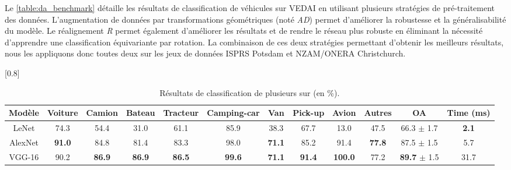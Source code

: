 Le \cref{table:da_benchmark} détaille les résultats de classification de véhicules sur \gls{VEDAI} en utilisant plusieurs stratégies de pré-traitement des données. L'augmentation de données par transformations géométriques (noté \emph{AD}) permet d'améliorer la robustesse et la généralisabilité du modèle. Le réalignement \emph{R} permet également d'améliorer les résultats et de rendre le réseau plus robuste en éliminant la nécessité d'apprendre une classification équivariante par rotation. La combinaison de ces deux stratégies permettant d'obtenir les meilleurs résultats, nous les appliquons donc toutes deux sur les jeux de données \gls{ISPRS} Potsdam et NZAM/ONERA Christchurch.

\begin{table}[t]
\centering
	\caption{Résultats de classification de plusieurs  sur  (en \%).}
    \label{table:cnn_benchmark}
    \setlength\tabcolsep{3pt}
    \scalebox{0.8}[0.8]{
	\begin{tabular}{cccccccccccc}
    \toprule
    \textbf{Modèle} &  \textbf{Voiture} & \textbf{Camion} & \textbf{Bateau} & \textbf{Tracteur} & \textbf{Camping-car} & \textbf{Van} & \textbf{Pick-up} & \textbf{Avion} & \textbf{Autres} & \textbf{OA} & \textbf{Time (ms)}\\
    \midrule
  LeNet & 74.3 & 54.4 & 31.0 & 61.1 & 85.9 & 38.3 & 67.7 & 13.0 & 47.5 & 66.3 $\pm$ 1.7  & \textbf{2.1}\\
  AlexNet & \textbf{91.0} & 84.8 & 81.4 & 83.3 & 98.0 & \textbf{71.1} & 85.2 & 91.4 & \textbf{77.8} & 87.5 $\pm$ 1.5 & 5.7\\
  VGG-16 & 90.2 & \textbf{86.9} & \textbf{86.9} & \textbf{86.5} & \textbf{99.6} & \textbf{71.1}
& \textbf{91.4} & \textbf{100.0} & 77.2 & \textbf{89.7} $\pm$ 1.5 & 31.7\\
    \bottomrule
  \end{tabular}}
\end{table}
\unskip

